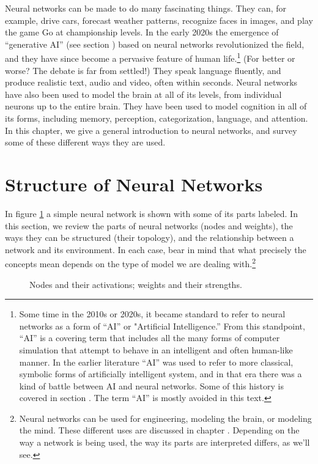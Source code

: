 Neural networks can be made to do many fascinating things. They can, for example, drive cars, forecast weather patterns, recognize faces in images, and play the game Go at championship levels. In the early 2020s the emergence of ``generative AI'' (see section ) based on neural networks revolutionized the field, and they have since become a pervasive feature of human life.\footnote{Some time in the 2010s or 2020s, it became standard to refer to neural networks as a form of ``AI'' or "Artificial Intelligence.''  From this standpoint, ``AI'' is a covering term that includes all the many forms of computer simulation that attempt to behave in an intelligent and often human-like manner.  In the earlier literature ``AI'' was used to refer to more classical, symbolic forms of artificially intelligent system, and in that era there was a kind of battle between AI and neural networks. Some of this history is covered in section .  The term ``AI'' is mostly avoided in this text.} (For better or worse? The debate is far from settled!) They speak language fluently, and produce realistic text, audio and video, often within seconds. Neural networks have also been used to model the brain at all of its levels, from individual neurons up to the entire brain. They have been used to model cognition in all of its forms, including memory, perception, categorization, language, and attention. In this chapter, we give a general introduction to neural networks, and survey some of these different ways they are used.

\section{Structure of Neural Networks}\label{structureNets}

In figure \ref{nodesWeights} a simple neural network is shown with some of its parts labeled. In this section, we review the parts of neural networks (nodes and weights), the ways they can be structured (their topology), and the relationship between a network and its environment. In each case, bear in mind that what precisely the concepts mean depends on the type of model we are dealing with.\footnote{Neural networks can be used for engineering, modeling the brain, or modeling the mind. These different uses are discussed in chapter . Depending on the way a network is being used, the way its parts are interpreted differs, as we'll see.}

\begin{figure}[h]
\centering
{}
\caption[Simbrain screenshot with additional elements added by Pamela Payne.]{Nodes and their activations; weights and their strengths.}
\label{nodesWeights}
\end{figure}

